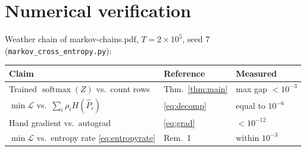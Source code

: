 \documentclass[11pt]{article}
\theoremstyle{remark}
\newcommand{\smax}{\operatorname{softmax}}
\begin{document}
\section{Numerical verification}

Weather chain of markov-chains.pdf, $T = 2\times10^5$, seed 7
(\texttt{markov\_cross\_entropy.py}):

\begin{center}
\begin{tabular}{lll}
\toprule
Claim & Reference & Measured\\
\midrule
Trained $\smax(Z)$ vs.\ count rows & Thm.~\ref{thm:main} &
  max gap $< 10^{-3}$\\
$\min \mathcal{L}$ vs.\ $\sum_i \rho_i H(\hat P_i)$ &
  \eqref{eq:decomp} & equal to $10^{-6}$\\
Hand gradient vs.\ autograd & \eqref{eq:grad} & $< 10^{-12}$\\
$\min \mathcal{L}$ vs.\ entropy rate \eqref{eq:entropyrate} &
  Rem.~1 & within $10^{-3}$\\
\bottomrule
\end{tabular}
\end{center}
\end{document}
